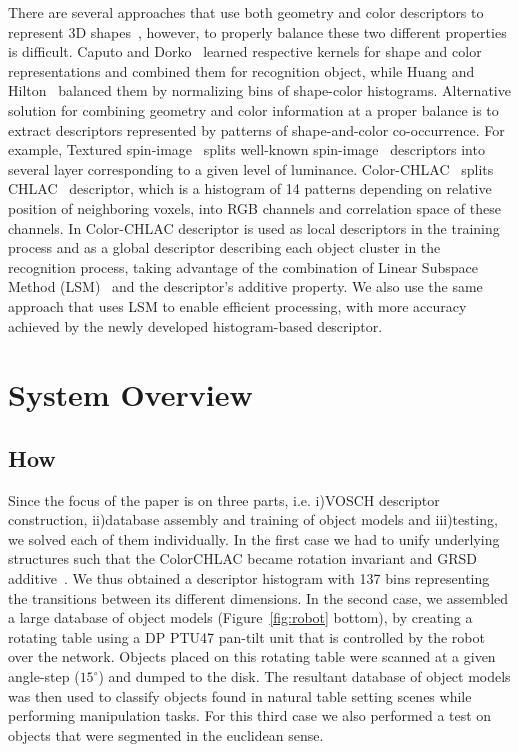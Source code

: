\documentclass[conference]{sty/IEEEtran}
\begin{document}
There are several approaches that use both geometry and color descriptors to
represent 3D shapes~\cite{park2006}, however, to properly balance these two
different properties is difficult.  Caputo and Dorko~\cite{caputo2002} learned
respective kernels for shape and color representations and combined them for
recognition object, while Huang and Hilton~\cite{huang2009} balanced them by
normalizing bins of shape-color histograms.  Alternative solution for combining
geometry and color information at a proper balance is to extract descriptors
represented by patterns of shape-and-color co-occurrence.  For example, Textured
spin-image~\cite{cortelazzo2006} splits well-known
spin-image~\cite{Johnson_spin_images} descriptors into several layer
corresponding to a given level of luminance. Color-CHLAC~\cite{kanezaki2010icra} 
splits CHLAC~\cite{kobayashi2004} descriptor, which is a histogram of 14 patterns 
depending on relative position of neighboring voxels, into RGB channels and correlation 
space of these channels.  In \cite{kanezaki2010icra} Color-CHLAC descriptor is used as local
descriptors in the training process and as a global descriptor describing each
object cluster in the recognition process, taking advantage of the combination
of Linear Subspace Method (LSM)~\cite{watanabe1973} and the descriptor's additive property.  We also use
the same approach that uses LSM to enable efficient
processing, with more accuracy achieved by the newly developed histogram-based
descriptor.

\section{System Overview}
\label{sec:overview}
\subsection{How}
Since the focus of the paper is on three parts, i.e. i)VOSCH descriptor
construction, ii)database assembly and training of object models and iii)testing,
we solved each of them individually. In the first case we had to unify underlying
structures such that the ColorCHLAC became rotation invariant and GRSD 
additive~\cite{kanezaki2010tvc}. We thus obtained a descriptor histogram with 
137 bins representing the transitions between its different dimensions.
In the second case, we assembled a large database of
object models (Figure~\ref{fig:robot} bottom), by creating a rotating
table using a DP PTU47 pan-tilt unit that is controlled by the robot over the
network. Objects placed on this rotating table were scanned at a given
angle-step ($15^\circ$) and dumped to the disk. The resultant database of
object models was then used to classify objects found in
natural table setting scenes while performing manipulation
tasks. For this third case we also performed a test on objects that were
segmented in the euclidean sense. 
\end{document}
